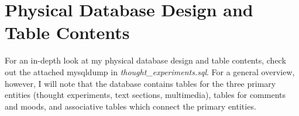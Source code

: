 \section{Physical Database Design and Table Contents}
For an in-depth look at my physical database design
and table contents, check out the attached mysqldump
in \emph{thought\_experiments.sql}. For a general overview,
however, I will note that the database contains tables
for the three primary entities (thought experiments, text sections, multimedia),
    tables for comments and moods, and associative tables 
    which connect the primary entities.
